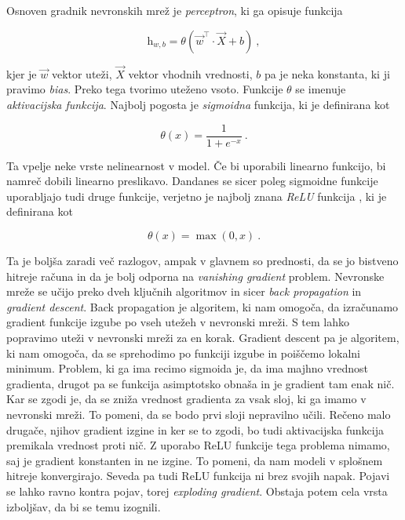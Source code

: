 \documentclass[a4paper]{article}
\begin{document}
Osnoven gradnik nevronskih mrež je \textit{perceptron}, ki ga opisuje funkcija 

\begin{equation}
    \mathrm{h}_{w,b} = \theta(\vec{w}^\intercal\cdot \vec{X}+ b)\>,
\end{equation}

kjer je $\vec{w}$ vektor uteži, $\vec{X}$ vektor vhodnih vrednosti, $b$ pa je neka konstanta, ki ji pravimo \textit{bias}.
Preko tega tvorimo uteženo vsoto. Funkcije $\theta$ se imenuje \textit{aktivacijska funkcija}. Najbolj pogosta je
\textit{sigmoidna} funkcija, ki je definirana kot

\begin{equation}
    \theta(x) = \frac{1}{1+e^{-x}}\>.
\end{equation}

Ta vpelje neke vrste nelinearnost v model. Če bi uporabili linearno funkcijo, bi namreč dobili linearno preslikavo. 
Dandanes se sicer poleg sigmoidne funkcije uporabljajo tudi druge funkcije, verjetno je najbolj znana \textit{ReLU}
funkcija \cite{agarap2019deep}, ki je definirana kot

\begin{equation}
    \theta(x) = \max(0,x)\>.
\end{equation}

Ta je boljša zaradi več razlogov, ampak v glavnem so prednosti, da se jo bistveno hitreje računa in da je bolj odporna
na \textit{vanishing gradient} problem. Nevronske mreže se učijo preko dveh ključnih algoritmov in sicer \textit{back propagation}
in \textit{gradient descent}. Back propagation je algoritem, ki nam omogoča, da izračunamo gradient funkcije izgube po
vseh utežeh v nevronski mreži. S tem lahko popravimo uteži v nevronski mreži za en korak. Gradient descent pa je algoritem,
ki nam omogoča, da se sprehodimo po funkciji izgube in poiščemo lokalni minimum. Problem, ki ga ima recimo sigmoida je, da
ima majhno vrednost gradienta, drugot pa se funkcija asimptotsko obnaša in je gradient tam enak nič. Kar se zgodi je, da 
se zniža vrednost gradienta za vsak sloj, ki ga imamo v nevronski mreži. To pomeni, da se bodo prvi sloji nepravilno 
učili. Rečeno malo drugače, njihov gradient izgine in ker se to zgodi, bo tudi aktivacijska funkcija premikala vrednost 
proti nič. Z uporabo ReLU funkcije tega problema nimamo, saj je gradient konstanten in ne izgine. To pomeni, da nam modeli 
v splošnem hitreje konvergirajo. Seveda pa tudi ReLU funkcija ni brez svojih napak. Pojavi se lahko ravno kontra pojav, 
torej \textit{exploding gradient}. Obstaja potem cela vrsta izboljšav, da bi se temu izognili. \\
\end{document}
